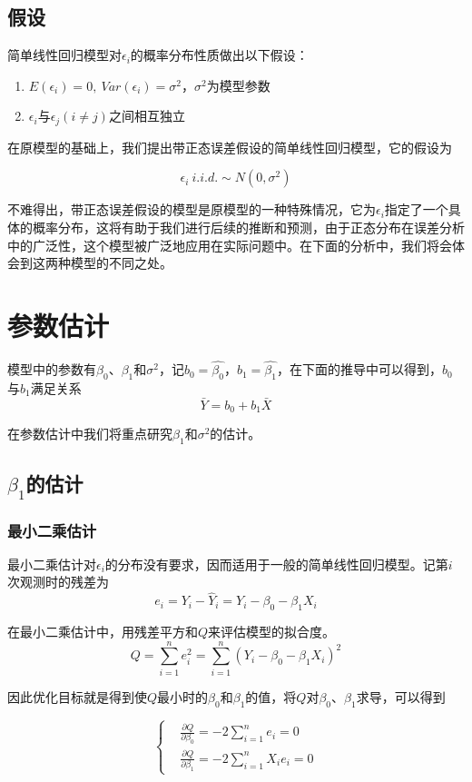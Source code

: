 \documentclass[UTF8]{ctexart}
\begin{document}
\subsection{假设}
简单线性回归模型对$\epsilon_i$的概率分布性质做出以下假设：

\begin{enumerate}
    \item $E(\epsilon_i)=0,\ Var(\epsilon_i)=\sigma^2$，$\sigma^2$为模型参数
    \item $\epsilon_i$与$\epsilon_j$$(i\ne j)$之间相互独立
\end{enumerate}

在原模型的基础上，我们提出带正态误差假设的简单线性回归模型，它的假设为

\begin{equation}
    \epsilon_i\ i.i.d.\sim N(0,\sigma^2)
\end{equation}

不难得出，带正态误差假设的模型是原模型的一种特殊情况，它为$\epsilon_i$指定了一个具体的概率分布，这将有助于我们进行后续的推断和预测，由于正态分布在误差分析中的广泛性，这个模型被广泛地应用在实际问题中。在下面的分析中，我们将会体会到这两种模型的不同之处。

\section{参数估计}
模型中的参数有$\beta_0$、$\beta_1$和$\sigma^2$，记$b_0=\hat{\beta_0}$，$b_1=\hat{\beta_1}$，在下面的推导中可以得到，$b_0$与$b_1$满足关系
$$\bar{Y}=b_0+b_1\bar{X}$$

在参数估计中我们将重点研究$\beta_1$和$\sigma^2$的估计。

\subsection{$\beta_1$的估计}
\subsubsection{最小二乘估计}
最小二乘估计对$\epsilon_i$的分布没有要求，因而适用于一般的简单线性回归模型。记第$i$次观测时的残差为
$$e_i=Y_i-\hat{Y}_i=Y_i-\beta_0-\beta_1X_i$$

在最小二乘估计中，用残差平方和$Q$来评估模型的拟合度。
$$Q=\sum_{i=1}^ne_i^2=\sum_{i=1}^n(Y_i-\beta_0-\beta_1X_i)^2$$

因此优化目标就是得到使$Q$最小时的$\beta_0$和$\beta_1$的值，将$Q$对$\beta_0$、$\beta_1$求导，可以得到

\begin{equation}
\left\{
\begin{aligned}
&\frac{\partial Q}{\partial \beta_0} = -2\sum_{i=1}^ne_i=0 \\
&\frac{\partial Q}{\partial \beta_1} = -2\sum_{i=1}^nX_ie_i=0
\end{aligned}
\right.
\end{equation}
\end{document}
